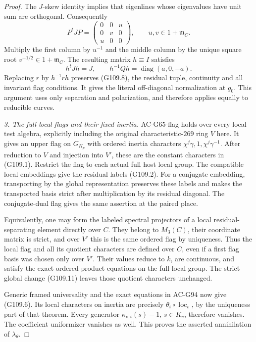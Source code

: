 \begin{proof}
The \(J\)-skew identity implies that eigenlines whose
eigenvalues have unit sum are orthogonal.  Consequently
\[
            P^tJP=
       \begin{pmatrix}0&0&u\\0&v&0\\u&0&0\end{pmatrix},
            \qquad u,v\in1+\mathfrak m_C.
 \tag{G109.10}
\]
Multiply the first column by \(u^{-1}\) and the middle
column by the unique square root \(v^{-1/2}\in1+\mathfrak m_C\).
The resulting matrix \(h\equiv I\) satisfies
\[
 h^tJh=J,\qquad h^{-1}Qh=\operatorname{diag}(a,0,-a).
 \tag{G109.11}
\]
Replacing \(r\) by \(h^{-1}rh\) preserves (G109.8), the
residual tuple, continuity and all invariant flag conditions.
It gives the literal off-diagonal normalization at \(g_0\).
This argument uses only separation and polarization, and
therefore applies equally to reducible curves.

\emph{3. The full local flags and their fixed inertia.}
AC-G65-flag holds over every local test algebra, explicitly
including the original characteristic-\(269\) ring \(V\) here.  It gives
an upper flag on \(G_{K_p}\) with ordered inertia characters
\(\chi^j\gamma,1,\chi^j\gamma^{-1}\).
After reduction to \(V\) and injection into \(V'\), these are
the constant characters in (G109.1).  Restrict the flag to each
actual full host local
group.  The compatible local embeddings give the residual
labels (G109.2).  For a conjugate embedding, transporting by
the global representation preserves these labels and makes
the transported basis strict after multiplication by its
residual diagonal.  The conjugate-dual flag gives the same
assertion at the paired place.

Equivalently, one may form the labeled spectral projectors
of a local residual-separating element directly over \(C\).
They belong to \(M_3(C)\), their coordinate matrix is strict,
and over \(V'\) this is the same ordered flag by uniqueness.
Thus the local flag and all its quotient characters are
defined over \(C\), even if a first flag basis was chosen
only over \(V'\).  Their values reduce to \(k\), are continuous,
and satisfy the exact ordered-product equations on the full
local group.  The strict global change (G109.11) leaves those
quotient characters unchanged.

Generic framed universality and the exact equations in
AC-G94 now give (G109.6).  Its local characters on inertia
are precisely \(\theta_i\circ\operatorname{loc}_v\), by the
uniqueness part of that theorem.  Every generator
\(\kappa_{v,i}(s)-1\), \(s\in K_v\), therefore vanishes.
The coefficient uniformizer vanishes as well.  This proves
the asserted annihilation of \(\lambda_\theta\).
\end{proof}

